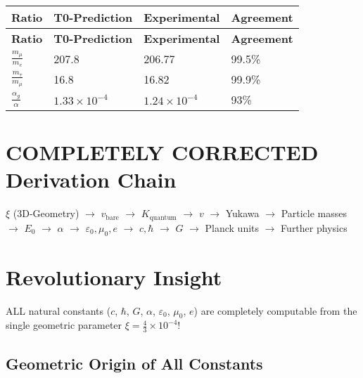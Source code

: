 \documentclass[12pt,a4paper]{article}
\begin{document}
	\begin{longtable}{|p{3cm}|p{3cm}|p{3cm}|p{3cm}|}
		\hline
		\textbf{Ratio} & \textbf{T0-Prediction} & \textbf{Experimental} & \textbf{Agreement} \\
		\hline
		\endfirsthead
		\hline
		\textbf{Ratio} & \textbf{T0-Prediction} & \textbf{Experimental} & \textbf{Agreement} \\
		\hline
		\endhead
		\(\frac{m_{\mu}}{m_e}\) & 207.8 & 206.77 & 99.5\% \\
		\hline
		\(\frac{m_{\tau}}{m_{\mu}}\) & 16.8 & 16.82 & 99.9\% \\
		\hline
		\(\frac{\alpha_g}{\alpha}\) & \(1.33 \times 10^{-4}\) & \(1.24 \times 10^{-4}\) & 93\% \\
		\hline
	\end{longtable}
	
	\section{COMPLETELY CORRECTED Derivation Chain}
	
	\begin{center}
		\(\xi\) (3D-Geometry) \(\rightarrow\) \(v_{\text{bare}}\) \(\rightarrow\) \(K_{\text{quantum}}\) \(\rightarrow\) \(v\) \(\rightarrow\) Yukawa \(\rightarrow\) Particle masses \(\rightarrow\) \(E_0\) \(\rightarrow\) \(\alpha\) \(\rightarrow\) \(\varepsilon_0, \mu_0, e\) \(\rightarrow\) \(c, \hbar\) \(\rightarrow\) \(G\) \(\rightarrow\) Planck units \(\rightarrow\) Further physics
	\end{center}
	
	\section{Revolutionary Insight}
	
	ALL natural constants (\(c\), \(\hbar\), \(G\), \(\alpha\), \(\varepsilon_0\), \(\mu_0\), \(e\)) are completely computable from the single geometric parameter \(\xi = \frac{4}{3} \times 10^{-4}\)!
	
	\subsection{Geometric Origin of All Constants}
	
\end{document}
